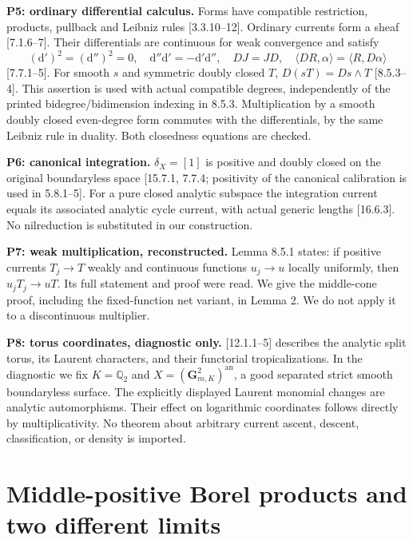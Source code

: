 \documentclass[
  11pt,
]{article}
\begin{document}
\textbf{P5: ordinary differential calculus.} Forms have compatible
restriction, products, pullback and Leibniz rules {[}3.3.10--12{]}.
Ordinary currents form a sheaf {[}7.1.6--7{]}. Their differentials are
continuous for weak convergence and satisfy
\[ (\mathrm d')^2=(\mathrm d'')^2=0,\quad
\mathrm d''\mathrm d'=-\mathrm d'\mathrm d'',\quad DJ=JD,\quad
\langle DR,\alpha\rangle=\langle R,D\alpha\rangle                 \tag{2}
\] {[}7.7.1--5{]}. For smooth \(s\) and symmetric doubly closed \(T\),
\(D(sT)=Ds\wedge T\) {[}8.5.3--4{]}. This assertion is used with actual
compatible degrees, independently of the printed bidegree/bidimension
indexing in 8.5.3. Multiplication by a smooth doubly closed even-degree
form commutes with the differentials, by the same Leibniz rule in
duality. Both closedness equations are checked.

\textbf{P6: canonical integration.} \(\delta_X=[1]\) is positive and
doubly closed on the original boundaryless space {[}15.7.1, 7.7.4;
positivity of the canonical calibration is used in 5.8.1--5{]}. For a
pure closed analytic subspace the integration current equals its
associated analytic cycle current, with actual generic lengths
{[}16.6.3{]}. No nilreduction is substituted in our construction.

\textbf{P7: weak multiplication, reconstructed.} Lemma 8.5.1 states: if
positive currents \(T_j\to T\) weakly and continuous functions
\(u_j\to u\) locally uniformly, then \(u_jT_j\to uT\). Its full
statement and proof were read. We give the middle-cone proof, including
the fixed-function net variant, in Lemma 2. We do not apply it to a
discontinuous multiplier.

\textbf{P8: torus coordinates, diagnostic only.} {[}12.1.1--5{]}
describes the analytic split torus, its Laurent characters, and their
functorial tropicalizations. In the diagnostic we fix \(K=\mathbb Q_2\)
and \(X=(\mathbf G_{m,K}^2)^{\mathrm{an}}\), a good separated strict
smooth boundaryless surface. The explicitly displayed Laurent monomial
changes are analytic automorphisms. Their effect on logarithmic
coordinates follows directly by multiplicativity. No theorem about
arbitrary current ascent, descent, classification, or density is
imported.

\section{Middle-positive Borel products and two different
limits}\label{middle-positive-borel-products-and-two-different-limits}
\end{document}
